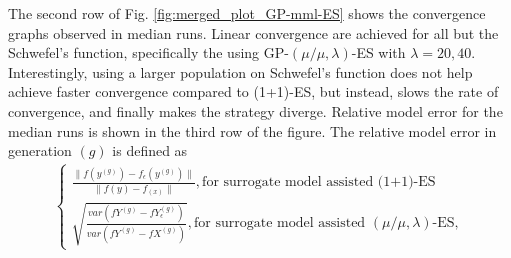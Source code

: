 The second row of Fig. \ref{fig:merged_plot_GP-mml-ES} shows the convergence graphs observed in median runs. Linear convergence are achieved for all but the Schwefel's function, specifically the using GP-$(\mu/\mu,\lambda)$-ES with $\lambda=20,40$. Interestingly, using a larger population on Schwefel's function does not help achieve faster convergence compared to (1+1)-ES, but instead, slows the  rate of convergence, and finally makes the strategy diverge. Relative model error for the median runs is shown in the third row of the figure. The relative model error in generation $(g)$ is defined as 
\begin{align}
\begin{cases}
\frac{\|f(y^{(g)})-f_{\epsilon}(y^{(g)}) \|}{\|f(y)-f_(x) \|},\text{for surrogate model assisted (1+1)-ES} \\
\sqrt{\frac{ var(fY^{(g)}-fY_{\epsilon}^{(g)})}{var(fY^{(g)}-fX^{(g)})}},\text{for surrogate model assisted }(\mu/\mu,\lambda)\text{-ES},
\end{cases}
\end{align}
